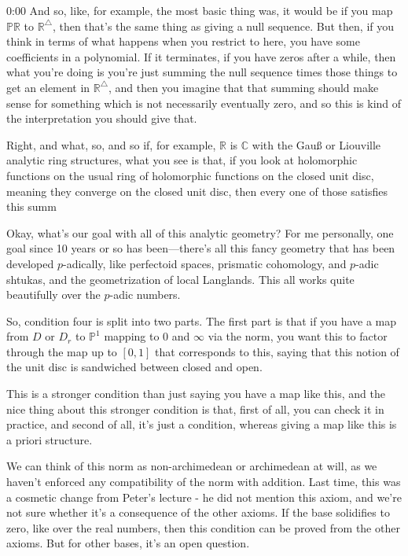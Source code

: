 \begin{unfinished}{0:00}
And so, like, for example, the most basic thing was, it would be if you map $\mathbb{PR}$ to $\mathbb{R}^\triangle$, then that's the same thing as giving a null sequence. But then, if you think in terms of what happens when you restrict to here, you have some coefficients in a polynomial. If it terminates, if you have zeros after a while, then what you're doing is you're just summing the null sequence times those things to get an element in $\mathbb{R}^\triangle$, and then you imagine that that summing should make sense for something which is not necessarily eventually zero, and so this is kind of the interpretation you should give that.

Right, and what, so, and so if, for example, $\mathbb{R}$ is $\mathbb{C}$ with the Gauß or Liouville analytic ring structures, what you see is that, if you look at holomorphic functions on the usual ring of holomorphic functions on the closed unit disc, meaning they converge on the closed unit disc, then every one of those satisfies this summ

Okay, what's our goal with all of this analytic geometry? For me personally, one goal since 10 years or so has been---there's all this fancy geometry that has been developed $p$-adically, like perfectoid spaces, prismatic cohomology, and $p$-adic shtukas, and the geometrization of local Langlands. This all works quite beautifully over the $p$-adic numbers.


So, condition four is split into two parts. The first part is that if you have a map from $D$ or $D_r$ to $\mathbb{P}^1$ mapping to $0$ and $\infty$ via the norm, you want this to factor through the map up to $[0,1]$ that corresponds to this, saying that this notion of the unit disc is sandwiched between closed and open. 


This is a stronger condition than just saying you have a map like this, and the nice thing about this stronger condition is that, first of all, you can check it in practice, and second of all, it's just a condition, whereas giving a map like this is a priori structure.

We can think of this norm as non-archimedean or archimedean at will, as we haven't enforced any compatibility of the norm with addition. Last time, this was a cosmetic change from Peter's lecture - he did not mention this axiom, and we're not sure whether it's a consequence of the other axioms. If the base solidifies to zero, like over the real numbers, then this condition can be proved from the other axioms. But for other bases, it's an open question.


\end{unfinished}
